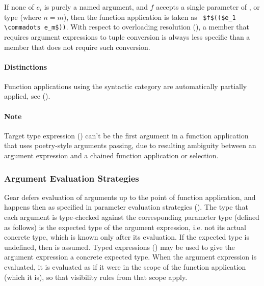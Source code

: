 If none of $e_i$ is purely a named argument, and $f$ accepts a single parameter of ,  or  type (where $n = m$), then the function application is taken as ~\lstinline!$f$(($e_1 \commadots e_m$))!. With respect to overloading resolution (), a member that requires argument expressions to tuple conversion is always less specific than a member that does not require such conversion. 

\paragraph{Distinctions}
Function applications using the  syntactic category are automatically partially applied, see ().

\paragraph{Note}
Target type expression () can't be the first argument in a function application that uses poetry-style arguments passing, due to resulting ambiguity between an argument expression and a chained function application or selection.





\subsubsection{Argument Evaluation Strategies}
\label{sec:arg-eval-strategies}

Gear defers evaluation of arguments up to the point of function application, and happens then as specified in parameter evaluation strategies (). The type that each argument is type-checked against the corresponding parameter type (defined as follows) is the expected type of the argument expression, i.e. not its actual concrete type, which is known only after its evaluation. If the expected type is undefined, then  is assumed. Typed expressions () may be used to give the argument expression a concrete expected type. When the argument expression is evaluated, it is evaluated as if it were in the scope of the function application (which it is), so that visibility rules from that scope apply. 






